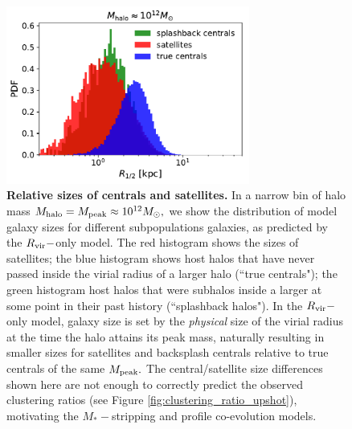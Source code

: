 \documentclass[usenatbib,usegraphicx,letterpaper]{mn2e}
\newcommand{\mstar}{M_{\ast}}
\newcommand{\mpeak}{M_{\rm peak}}
\newcommand{\mhalo}{M_{\rm halo}}
\newcommand{\rvir}{R_{\rm vir}}
\newcommand{\msun}{M_\odot}
\begin{document}
\begin{figure}
\centering
\includegraphics[width=8cm]{FIGS/cen_sat_sizes.pdf}
\caption{
{\bf Relative sizes of centrals and satellites.} In a narrow bin of halo mass $\mhalo=\mpeak\approx10^{12}\msun,$ we show the distribution of model galaxy sizes for different subpopulations galaxies, as predicted by the $\rvir-$only model. The red histogram shows the sizes of satellites; the blue histogram shows host halos that have never passed inside the virial radius of a larger halo (``true centrals"); the green histogram host halos that were subhalos inside a larger at some point in their past history (``splashback halos"). In the $\rvir-$only model, galaxy size is set by the {\em physical} size of the virial radius at the time the halo attains its peak mass, naturally resulting in smaller sizes for satellites and backsplash centrals relative to true centrals of the same $\mpeak.$ The central/satellite size differences shown here are not enough to correctly predict the observed clustering ratios (see Figure \ref{fig:clustering_ratio_upshot}), motivating the $\mstar-$stripping and profile co-evolution models.
}
\label{fig:censatsizehist}
\end{figure}
\end{document}
